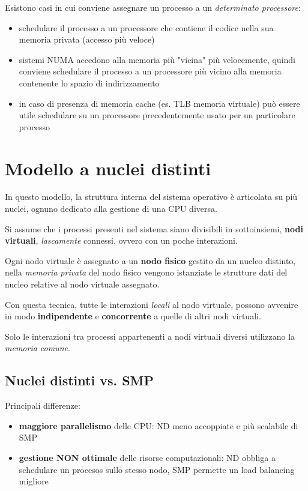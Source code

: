 Esistono casi in cui conviene assegnare un processo a un \textit{determinato processore}:
\begin{itemize}
    \item schedulare il processo a un processore che contiene il codice nella sua memoria privata (accesso più veloce)
    \item sistemi NUMA accedono alla memoria più "vicina" più velocemente, quindi conviene schedulare il processo a un processore più vicino alla memoria contenente lo spazio di indirizzamento
    \item in caso di presenza di memoria cache (es. TLB memoria virtuale) può essere utile schedulare su un processore precedentemente usato per un particolare processo
\end{itemize}

\section{Modello a nuclei distinti}
In questo modello, la struttura interna del sistema operativo è articolata su più nuclei, ognuno dedicato alla gestione di una CPU diversa.

Si assume che i processi presenti nel sistema siano divisibili in sottoinsiemi, \textbf{nodi virtuali}, \textit{lascamente} connessi, ovvero con un poche interazioni.

Ogni nodo virtuale è assegnato a un \textbf{nodo fisico} gestito da un nucleo distinto, nella \textit{memoria privata} del nodo fisico vengono istanziate le strutture dati del nucleo relative al nodo virtuale assegnato.

Con questa tecnica, tutte le interazioni \textit{locali} al nodo virtuale, possono avvenire in modo \textbf{indipendente} e \textbf{concorrente} a quelle di altri nodi virtuali.

Solo le interazioni tra processi appartenenti a nodi virtuali diversi utilizzano la \textit{memoria comune}.

\subsection{Nuclei distinti vs. SMP}
Principali differenze:
\begin{itemize}
    \item \textbf{maggiore parallelismo} delle CPU: ND meno accoppiate e più scalabile di SMP
    \item \textbf{gestione NON ottimale} delle risorse computazionali: ND obbliga a schedulare un procesos sullo stesso nodo, SMP permette un load balancing migliore
\end{itemize}

